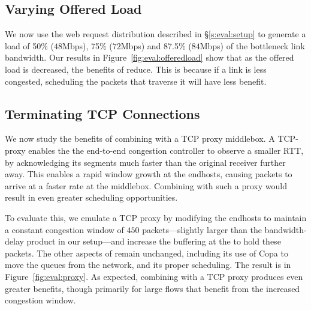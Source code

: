 

\subsection{Varying Offered Load}\label{s:eval:offeredload}
We now use the web request distribution described in \S\ref{s:eval:setup} to generate a load of 50\% ($48$Mbps), 75\% ($72$Mbps) and 87.5\% ($84$Mbps) of the bottleneck link bandwidth. Our results in Figure~\ref{fig:eval:offeredload} show that as the offered load is decreased, the benefits of \name reduce. This is because if a link is less congested, scheduling the packets that traverse it will have less benefit.



\subsection{Terminating TCP Connections}\label{s:eval:proxy}

We now study the benefits of combining \name with a TCP proxy middlebox. A TCP-proxy enables the the end-to-end congestion controller to observe a smaller RTT, by acknowledging its segments much faster than the original receiver further away. This enables a rapid window growth at the endhosts, causing packets to arrive at a faster rate at the middlebox. Combining \name with such a proxy would result in even greater scheduling opportunities. 

To evaluate this, we emulate a TCP proxy by modifying the endhosts to maintain a constant congestion window of $450$ packets---slightly larger than the bandwidth-delay product in our setup---and increase the buffering at the \inbox to hold these packets. The other aspects of \name remain unchanged, including its use of Copa to move the queues from the network, and its proper scheduling.
The result is in Figure~\ref{fig:eval:proxy}. As expected, combining \name with a TCP proxy produces even greater benefits, though primarily for large flows that benefit from the increased congestion window. 



